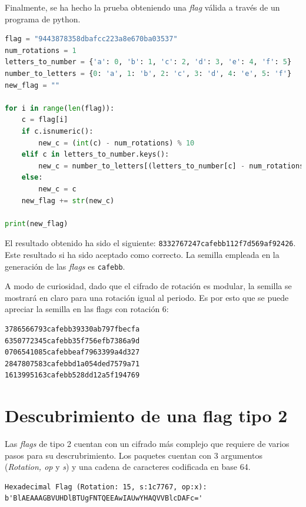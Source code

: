 \documentclass[]{article}
\begin{document}
Finalmente, se ha hecho la prueba obteniendo una \textit{flag} válida a través
de un programa de python.

\lstset{style=python}
\begin{lstlisting}[language=Python, caption=Decodificación de una flag de rotación 1]
flag = "9443878358dbafcc223a8e670ba03537"
num_rotations = 1
letters_to_number = {'a': 0, 'b': 1, 'c': 2, 'd': 3, 'e': 4, 'f': 5}
number_to_letters = {0: 'a', 1: 'b', 2: 'c', 3: 'd', 4: 'e', 5: 'f'}
new_flag = ""

for i in range(len(flag)):
    c = flag[i]
    if c.isnumeric():
        new_c = (int(c) - num_rotations) % 10
    elif c in letters_to_number.keys():
        new_c = number_to_letters[(letters_to_number[c] - num_rotations) % 6]
    else:
        new_c = c
    new_flag += str(new_c)

print(new_flag)

\end{lstlisting}

El resultado obtenido ha sido el siguiente:
\texttt{8332767247cafebb112f7d569af92426}. Este resultado si ha sido aceptado
como correcto. La semilla empleada en la generación de las \textit{flags} es
\texttt{cafebb}.

A modo de curiosidad, dado que el cifrado de rotación es modular, la semilla se
mostrará en claro para una rotación igual al periodo. Es por esto que se puede
apreciar la semilla en las flags con rotación 6:

\begin{lstlisting}[language=flag, caption=Flags para rotacion 6]
3786566793cafebb39330ab797fbecfa
6350772345cafebb35f756efb7386a9d
0706541085cafebbeaf7963399a4d327
2847807583cafebbd1a054ded7579a71
1613995163cafebb528dd12a5f194769
\end{lstlisting}

\section{Descubrimiento de una flag tipo 2}
\label{sec:tipo2}

Las \textit{flags} de tipo 2 cuentan con un cifrado más complejo que requiere de varios pasos para su descrubrimiento. Los paquetes cuentan con 3 argumentos (\textit{Rotation, op} y \textit{s}) y una cadena de caracteres codificada en base 64.


\begin{lstlisting}[language=flag, caption=Ejemplo de flag tipo 2]
Hexadecimal Flag (Rotation: 15, s:1c7767, op:x): b'BlAEAAAGBVUHDlBTUgFNTQEEAwIAUwYHAQVVBlcDAFc='
\end{lstlisting}
\end{document}
